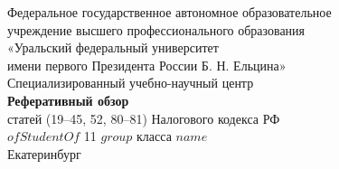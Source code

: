 \documentclass{report}
\begin{document}
\begin{titlepage}
    \center
    \Large

    Федеральное государственное автономное образовательное\\
    учреждение высшего профессионального образования\\
    «Уральский федеральный университет\\
    имени первого Президента России Б. Н. Ельцина»\\
    Специализированный учебно-научный центр\\

    \vfill
    \textbf{Реферативный обзор}\\
    статей (19--45, 52, 80--81) Налогового кодекса РФ\\
    $ofStudentOf$ 11 $group$ класса $name$\\

    \vfill
    {Екатеринбург}\\
    {\the\year}\\
\end{titlepage}
\end{document}
